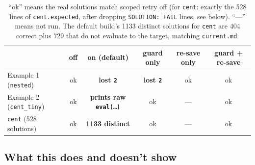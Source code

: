 \documentclass[11pt]{article}
\newcommand{\code}[1]{\texttt{#1}}
\begin{document}
\begin{table}[htb]
\centering
\small
\begin{tabular}{@{}lccccc@{}}
\toprule
& off & on (default) & guard only & re-save only & guard + re-save \\
\midrule
Example 1 (\code{nested}) & ok & \textbf{lost \code{2}} & \textbf{lost \code{2}} & ok & ok \\
Example 2 (\code{cent\_tiny}) & ok & \textbf{prints raw \code{eval(\ldots)}} & ok & --- & ok \\
\code{cent} (528 solutions) & ok & \textbf{1133 distinct} & ok & --- & ok \\
\bottomrule
\end{tabular}
\caption{``ok'' means the real solutions match scoped retry off (for
  \code{cent}: exactly the 528 lines of \code{cent.expected}, after dropping
  \code{SOLUTION: FAIL} lines, see below). ``---'' means not run. The
  default build's 1133 distinct solutions for \code{cent} are 404 correct plus
  729 that do not evaluate to the target, matching \code{current.md}.}
\label{tab:runs}
\end{table}

\subsection{What this does and doesn't show}
\end{document}
